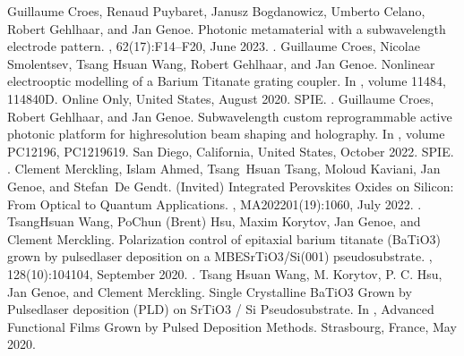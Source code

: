 \documentclass[a4paper,10pt,english,openany,oneside]{jupyterBook}
\begin{document}
\sphinxstepscope

\begin{sphinxthebibliography}{1}
\sphinxAtStartPar
Guillaume Croes, Renaud Puybaret, Janusz Bogdanowicz, Umberto Celano, Robert Gehlhaar, and Jan Genoe. Photonic metamaterial with a subwavelength electrode pattern. , 62(17):F14–F20, June 2023. .
\sphinxAtStartPar
Guillaume Croes, Nicolae Smolentsev, Tsang Hsuan Wang, Robert Gehlhaar, and Jan Genoe. Non\sphinxhyphen{}linear electro\sphinxhyphen{}optic modelling of a Barium Titanate grating coupler. In , volume 11484, 114840D. Online Only, United States, August 2020. SPIE. .
\sphinxAtStartPar
Guillaume Croes, Robert Gehlhaar, and Jan Genoe. Sub\sphinxhyphen{}wavelength custom reprogrammable active photonic platform for high\sphinxhyphen{}resolution beam shaping and holography. In , volume PC12196, PC1219619. San Diego, California, United States, October 2022. SPIE. .
\sphinxAtStartPar
Clement Merckling, Islam Ahmed, Tsang Hsuan Tsang, Moloud Kaviani, Jan Genoe, and Stefan De Gendt. (Invited) Integrated Perovskites Oxides on Silicon: From Optical to Quantum Applications. , MA2022\sphinxhyphen{}01(19):1060, July 2022. .
\sphinxAtStartPar
Tsang\sphinxhyphen{}Hsuan Wang, Po\sphinxhyphen{}Chun (Brent) Hsu, Maxim Korytov, Jan Genoe, and Clement Merckling. Polarization control of epitaxial barium titanate (BaTiO3) grown by pulsed\sphinxhyphen{}laser deposition on a MBE\sphinxhyphen{}SrTiO3/Si(001) pseudo\sphinxhyphen{}substrate. , 128(10):104104, September 2020. .
\sphinxAtStartPar
Tsang Hsuan Wang, M. Korytov, P. C. Hsu, Jan Genoe, and Clement Merckling. Single Crystalline BaTiO3 Grown by Pulsed\sphinxhyphen{}laser deposition (PLD) on SrTiO3 / Si Pseudo\sphinxhyphen{}substrate. In , Advanced Functional Films Grown by Pulsed Deposition Methods. Strasbourg, France, May 2020.

\end{sphinxthebibliography}
\end{document}
